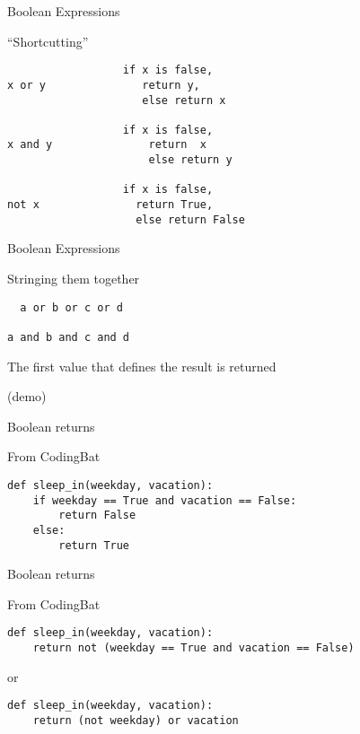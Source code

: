 \documentclass{beamer}
\begin{document}
\begin{frame}[fragile]{Boolean Expressions}

{\Large ``Shortcutting''}

\begin{verbatim}
                  if x is false, 
x or y               return y,
                     else return x

                  if x is false,
x and y               return  x
                      else return y

                  if x is false,
not x               return True,
                    else return False 
\end{verbatim}

\end{frame} 

\begin{frame}[fragile]{Boolean Expressions}

{\Large Stringing them together}

\begin{verbatim}
￼ a or b or c or d

a and b and c and d  
\end{verbatim}

{\Large The first value that defines the result is returned}

\vfill
(demo)
\end{frame}


\begin{frame}[fragile]{Boolean returns}

{\Large From CodingBat}
\vfill
\begin{verbatim}
def sleep_in(weekday, vacation):
    if weekday == True and vacation == False:
        return False
    else:
        return True
\end{verbatim}

\end{frame}



\begin{frame}[fragile]{Boolean returns}

{\Large From CodingBat}


\begin{verbatim}
def sleep_in(weekday, vacation):
    return not (weekday == True and vacation == False)
\end{verbatim}

or

\begin{verbatim}
def sleep_in(weekday, vacation):
    return (not weekday) or vacation
\end{verbatim}


\end{frame}
\end{document}
